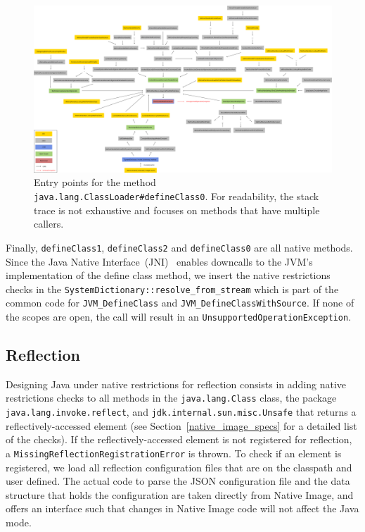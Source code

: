 \begin{figure}
    \centering
    \includegraphics[angle=90,origin=c,scale=0.26]{resources/Group 401.png}
    \caption{Entry points for the method \texttt{java.lang.ClassLoader\#defineClass0}. For readability, the stack trace is not exhaustive and focuses on methods that have multiple callers.}
    \label{fig:define_class_0}
\end{figure}


Finally, \verb|defineClass1|, \verb|defineClass2| and \verb|defineClass0| are all native methods. Since the Java Native Interface~(JNI)~\cite{noauthor_jni_nodate} enables downcalls to the JVM's implementation of the define class method, we insert the native restrictions checks in the \verb|SystemDictionary::resolve_from_stream| which is part of the common code for \verb|JVM_DefineClass| and \verb|JVM_DefineClassWithSource|. If none of the scopes are open, the call will result in an \verb|UnsupportedOperationException|. 

\subsection{Reflection}
Designing Java under native restrictions for reflection consists in adding native restrictions checks to all methods in the \verb|java.lang.Class| class, the package \verb|java.lang.invoke.reflect|, and \verb|jdk.internal.sun.misc.Unsafe| that returns a reflectively-accessed element (see Section~\ref{native_image_specs} for a detailed list of the checks). 
If the reflectively-accessed element is not registered for reflection, a \verb|MissingReflectionRegistrationError| is thrown.
To check if an element is registered, we load all reflection configuration files that are on the classpath and user defined. The actual code to parse the JSON configuration file and the data structure that holds the configuration are taken directly from Native Image, and offers an interface such that changes in Native Image code will not affect the Java mode.

